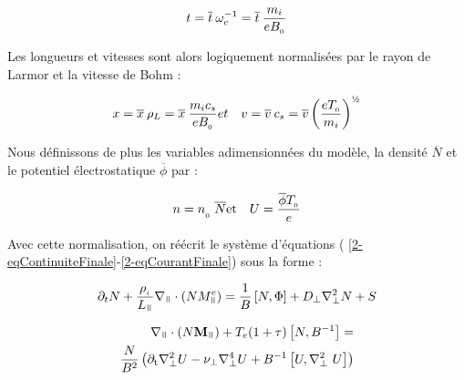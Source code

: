 \begin{refsection}
\begin{equation}
t = \overline{t}\:\omega_c^{{-1}} =
\overline{t}\:\frac{m_i}{eB_{_{0}}}
\end{equation}

Les longueurs et vitesses sont alors logiquement normalisées par le rayon de
Larmor et la vitesse de Bohm :

\begin{eqnarray}
x = \overline{x}\:\rho_L =
\overline{x}\:\frac{m_ic_s}{eB\indice{0}} &
et &
v=\overline{v}\:c_s=\overline{v}\left(\frac{eT\indice{0}}{m_i}\right)^{\text{\textonehalf}}
\end{eqnarray}

Nous définissons de plus les variables adimensionnées du modèle, la densité
$\overline{N}$ et le potentiel électrostatique $\overline \phi$ par :

\begin{eqnarray}
n = n_{_{_{0}}}\:\overline{N} & \text{et} & U=\frac{\overline
{\phi}T_{_{0}}}{e}
\end{eqnarray}

Avec cette normalisation, on réécrit le système d'équations (
\eqref{2-eqContinuiteFinale}-\eqref{2-eqCourantFinale}) sous la forme :

\begin{equation}
\label{2-eqContinuiteNorm}
\partial_t N +
\frac{\rho\indice{i}}{L_{\para}}\nabla_{\para}\cdot(NM^e_{\para}) =
\frac{1}{B}\left[N,\Phi\right] + D_\perp\nabla^2_\perp N + S
\end{equation}

\begin{equation}\begin{split}
\label{2-eqCourantNorm}
\nabla_\para\cdot(N\mathbf{M}_\para) +
T_e(1+\tau)\left[N,B\puissance{-1}\right] =\\
\frac{N}{B^2}\left(\partial_\text{t}\nabla_\perp^2 U - \nu_\perp
\nabla_\perp^4U+
B\puissance{-1}\left[U,\nabla_\perp^2\ U\right]\right)
\end{split}
\end{equation}


\end{refsection}
